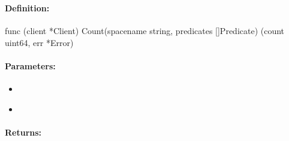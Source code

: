 \pagebreak
\subsubsection{}
\label{api:Go:Count}


\paragraph{Definition:}
\begin{gocode}
func (client *Client) Count(spacename string, predicates []Predicate) (count uint64, err *Error)
\end{gocode}

\paragraph{Parameters:}
\begin{itemize}[noitemsep]
\item {}\\

\item {}\\

\end{itemize}

\paragraph{Returns:}

